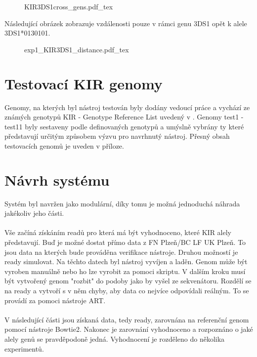 \documentclass[czech,DP]{thesiskiv}
\numberwithin{equation}{section}
\begin{document}
\begin{figure}[H]
    \centering
    \def\svgwidth{\columnwidth}
    {KIR3DS1cross_gens.pdf_tex} 
\end{figure}

\noindent
Následující obrázek zobrazuje vzdálenosti pouze v rámci genu 3DS1 opět k alele 3DS1*0130101.
\begin{figure}[H]
	\centering
    \def\svgwidth{300px}
    {exp1_KIR3DS1_distance.pdf_tex} 
\end{figure}

\section{Testovací KIR genomy}
Genomy, na kterých byl nástroj testován byly dodány vedoucí práce a vychází ze známých genotypů KIR - Genotype Reference List uvedený v \cite{kir_genotypes_10}. Genomy test1 - test11 byly sestaveny podle definovaných genotypů a umýslně vybrány ty které představují určitým způsobem výzvu pro navrhnutý nástroj. Přesný obsah testovacích genomů je uveden v příloze.



\section{Návrh systému}
Systém byl navržen jako modulární, díky tomu je možná jednoduchá náhrada jakékoliv jeho části. 
\\
\\ 
Vše začíná získáním readů pro která má být vyhodnoceno, které KIR alely představují. Buď je možné dostat přímo data z FN Plzeň/BC LF UK Plzeň. To jsou data na kterých bude prováděna verifikace nástroje. Druhou možností je ready simulovat. Na těchto datech byl nástroj vyvíjen a laděn. Genom může být vyroben manuálně nebo ho lze vyrobit za pomoci skriptu. V dalším kroku musí být vytvořený genom "rozbit" do podoby jako by vyšel ze sekvenátoru. Rozdělí se na ready a vytvoří s v něm chyby, aby data co nejvíce odpovídali reálným. To se provádí za pomoci nástroje ART.
\\
\\
V následující části jsou získaná data, tedy ready, zarovnána na referenční genom pomocí nástroje Bowtie2. Nakonec je zarovnání vyhodnoceno a rozpoznáno o jaké alely genů se pravděpodoně jedná. Vyhodnocení je rozděleno do několika experimentů.
\end{document}
